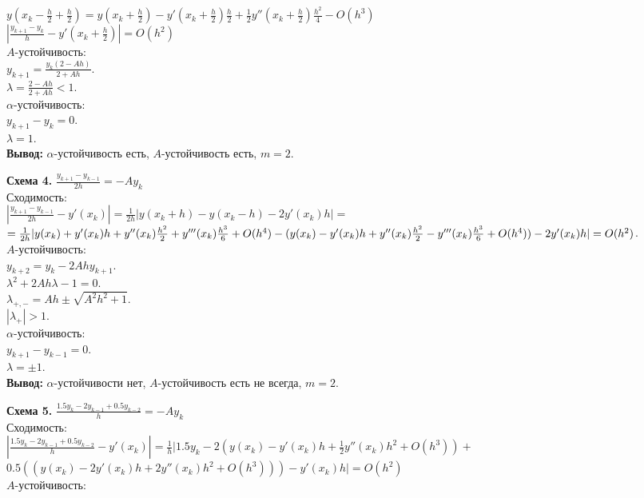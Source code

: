 \documentclass[14pt,a4paper]{extarticle}
\newcommand{\1}{\mathbbm{1}}
\begin{document}
$y(x_k - \frac{h}{2} + \frac{h}{2}) = y(x_k + \frac{h}{2}) - y'(x_k + \frac{h}{2}) \frac{h}{2} + \frac{1}{2} y''(x_k + \frac{h}{2}) \frac{h^2}{4} - O(h^3)$\\ 
$|\frac{y_{k+1}-y_k}{h} - y'(x_k + \frac{h}{2})| = O(h^2)$\\ 
$A$-устойчивость:\\ 
$y_{k+1} = \frac{y_k (2 - A h)}{2 + Ah} $. \\
$\lambda = \frac{2 - A h}{2+ A h} < 1$. \\
$\alpha$-устойчивость:\\ $y_{k+1} - y_k = 0$. \\
$\lambda = 1$. \\
\textbf{Вывод:} $\alpha$-устойчивость есть, $A$-устойчивость есть, $m=2$.
\par
\textbf{Схема 4.} $\frac{y_{k+1}-y_{k-1}}{2 h} = -A y_k$ \\
Сходимость:\\
$|\frac{y_{k+1}-y_{k-1}}{2h} - y'(x_k)| = \frac{1}{2 h} |y(x_{k} + h) - y(x_{k} - h) - 2 y'(x_k) h| =$\\
$= \frac{1}{2 h} |y(x_{k}) + y'(x_{k}) h + y''(x_{k}) \frac{h^2}{2} + y'''(x_{k}) \frac{h^3}{6} + O(h^4) \\ 
- (y(x_{k}) - y'(x_{k}) h + y''(x_{k}) \frac{h^2}{2} - y'''(x_{k}) \frac{h^3}{6} + O(h^4)) - 2 y'(x_k) h| = O(h^2)$.\\
$A$-устойчивость:\\ 
 $y_{k+2} = y_{k} - 2 A h y_{k+1} $.\\
 $\lambda^2 + 2 A h \lambda - 1 = 0$. \\
 $\lambda_{+, -} = A h \pm \sqrt{A^2 h^2 + 1}$. \\
 $|\lambda_{+}| > 1 $. \\
$\alpha$-устойчивость:\\ $y_{k+1} - y_{k-1} = 0$. \\
$\lambda = \pm 1$. \\
 \textbf{Вывод:} $\alpha$-устойчивости нет, $A$-устойчивость есть не всегда, $m=2$. 
 \par
 \textbf{Схема 5.} $\frac{1.5 y_k-2 y_{k-1}+0.5 y_{k-2}}{h} = -A y_k$ \\ 
 Сходимость:\\
$|\frac{1.5 y_k-2 y_{k-1}+0.5 y_{k-2}}{h} -y'(x_k)| = \frac{1}{h} |1.5 y_k-2(y(x_k) - y'(x_k)h +\frac{1}{2} y''(x_k)h^2 + O(h^3))+$
$0.5 ((y(x_k) - 2 y'(x_k)h +2 y''(x_k)h^2 + O(h^3))) -y'(x_k) h| = O(h^2)$\\
$A$-устойчивость:\\ 
\end{document}
